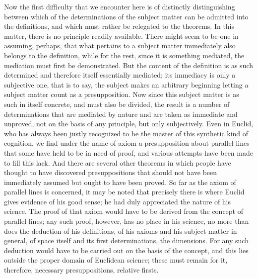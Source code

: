 Now the first difficulty that we encounter here is
of distinctly distinguishing between
which of the determinations of the subject matter
can be admitted into the definitions,
and which must rather be relegated to the theorems.
In this matter, there is no principle readily available.
There might seem to be one in assuming, perhaps,
that what pertains to a subject matter
immediately also belongs to the definition,
while for the rest, since it is something mediated,
the mediation must first be demonstrated.
But the content of the definition is as such determined
and therefore itself essentially mediated;
its immediacy is only a subjective one, that is to say,
the subject makes an arbitrary beginning
letting a subject matter count as a presupposition.
Now since this subject matter is as such in itself concrete,
and must also be divided,
the result is a number of determinations
that are mediated by nature
and are taken as immediate and unproved,
not on the basis of any principle,
but only subjectively.
Even in Euclid, who has always been justly recognized
to be the master of this synthetic kind of cognition,
we find under the name of axiom a presupposition
about parallel lines that some have held to be in need of proof,
and various attempts have been made to fill this lack.
And there are several other theorems in which
people have thought to have discovered presuppositions
that should not have been immediately assumed
but ought to have been proved.
So far as the axiom of parallel lines is concerned,
it may be noted that precisely there is
where Euclid gives evidence of his good sense;
he had duly appreciated the nature of his science.
The proof of that axiom would have to be
derived from the concept of parallel lines;
any such proof, however, has no place in his science,
no more than does the deduction of his definitions,
of his axioms and his subject matter in general,
of space itself and its first determinations, the dimensions.
For any such deduction would have to be
carried out on the basis of the concept,
and this lies outside the proper domain
of Euclidean science;
these must remain for it, therefore,
necessary presuppositions, relative firsts.

